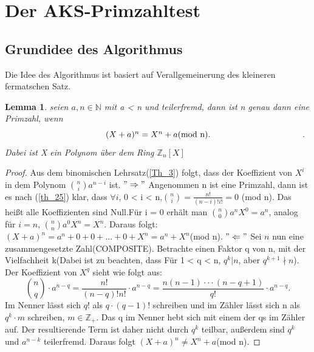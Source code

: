 \documentclass[12pt,oneside]{article}
\newtheorem{lemma}[theorem]{Lemma}
\theoremstyle{remark}
\theoremstyle{definition}
\begin{document}
\smallskip


\section{Der AKS-Primzahltest}
\subsection{Grundidee des Algorithmus}
Die Idee des Algorithmus ist basiert auf  Verallgemeinerung des kleineren fermatschen Satz.
\begin{flushleft}
\begin{lemma}\label{hauptlemma}
seien $a,n \in \mathbb{N}$ mit a < n und teilerfremd, dann ist n genau dann eine Primzahl, wenn \newline
\begin{equation}\label{eq:1}
\centerline{ $(X + a)^n = X^n +a $(mod n).}.
\end{equation}\newline
Dabei ist X ein Polynom über dem Ring $\mathbb{Z}_{n}[X]$
\end{lemma}
\begin{proof}
Aus dem binomischen Lehrsatz(\ref{Th_3}) folgt, dass der Koeffizient von $X^i$ in dem Polynom ${n \choose i} a^{n-i}$ ist.\newline\newline
$"\Rightarrow"$\newline
Angenommen n ist eine Primzahl, dann ist es nach (\ref{th_25}) klar, dass $\forall i $, 0 < i < n,\newline\smallskip ${n \choose i} = \frac{n!}{(n-i)! i!} = 0 $ (mod n). Das heißt alle Koeffizienten sind Null.\newline\smallskip Für i = 0 erhält man  ${n \choose 0} a^n X^0 = a^n$, analog für $i = n$, ${n \choose n} a^0 X^n = X^n$. Daraus folgt:
$(X + a)^n = a^n + 0 + 0 + ... + 0 + X^n = a^n + X^n$(mod n).\newline\newline
$"\Leftarrow"$\newline
Sei $n$ nun eine zusammengesetzte Zahl(COMPOSITE). Betrachte einen Faktor q von n, mit der Vielfachheit k(Dabei ist zu beachten, dass Für 1 < q < n, $q^k | n$, aber $q^{k+1} \nmid n$).\newline
Der Koeffizient von $X^q$ sieht wie folgt aus:\newline\smallskip
\begin{equation}
    {n \choose q} \cdot a^{n-q} = \frac{n!}{(n-q)! n!} \cdot a^{n-q} = \frac{n(n-1)\cdot \cdot \cdot (n-q+1)}{q!} \cdot a^{n-q}.
\end{equation}
\newline\newline
Im Nenner lässt sich $q!$ als $q \cdot (q-1)!$ schreiben und im Zähler lässt sich n als $q^k\cdot m$ schreiben, $m \in \mathbb{Z}_{+}$. Das q im Nenner hebt sich mit einem der qs im Zähler auf. Der resultierende Term ist daher nicht durch $q^k$ teilbar, außerdem sind $q^k$ und $a^{n-k}$ teilerfremd. Daraus folgt $(X + a)^n \neq X^n + a $(mod n).
\end{proof}


\end{flushleft}
\end{document}
